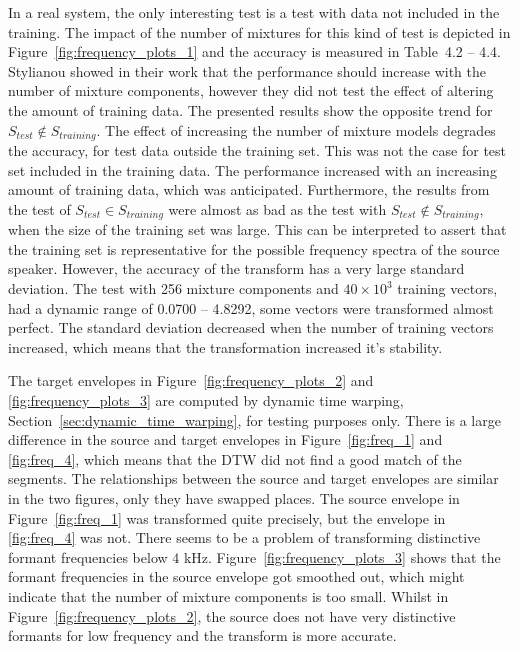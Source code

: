 In a real system, the only interesting test is a test with data not included in the training. The impact of the number of mixtures for this kind of test is depicted in Figure~\ref{fig:frequency_plots_1} and the accuracy is measured in Table~4.2 -- 4.4. Stylianou \etal \cite{stylianou98} showed in their work that the performance should increase with the number of mixture components, however they did not test the effect of altering the amount of training data. The presented results show the opposite trend for $S_{test}\notin S_{training}$. The effect of increasing the number of mixture models degrades the accuracy, for test data outside the training set. This was not the case for test set included in the training data. The performance increased with an increasing amount of training data, which was anticipated. Furthermore, the results from the test of $S_{test}\in S_{training}$ were almost as bad as the test with $S_{test}\notin S_{training}$, when the size of the training set was large. This can be interpreted to assert that the training set is representative for the possible frequency spectra of the source speaker. However, the accuracy of the transform has a very large standard deviation. The test with 256 mixture components and $40\times 10^3$ training vectors, had a dynamic range of 0.0700 -- 4.8292, \ie some vectors were transformed almost perfect. The standard deviation decreased when the number of training vectors increased, which means that the transformation increased it's stability. 

The target envelopes in Figure~\ref{fig:frequency_plots_2} and \ref{fig:frequency_plots_3} are computed by dynamic time warping, Section~\ref{sec:dynamic_time_warping}, for testing purposes only. There is a large difference in the source and target envelopes in Figure~\ref{fig:freq_1} and \ref{fig:freq_4}, which means that the DTW did not find a good match of the segments. The relationships between the source and target envelopes are similar in the two figures, only they have swapped places. The source envelope in Figure~\ref{fig:freq_1} was transformed quite precisely, but the envelope in \ref{fig:freq_4} was not. There seems to be a problem of transforming distinctive formant frequencies below $4$ kHz. Figure~\ref{fig:frequency_plots_3} shows that the formant frequencies in the source envelope got smoothed out, which might indicate that the number of mixture components is too small. Whilst in Figure~\ref{fig:frequency_plots_2}, the source does not have very distinctive formants for low frequency and the transform is more accurate.

